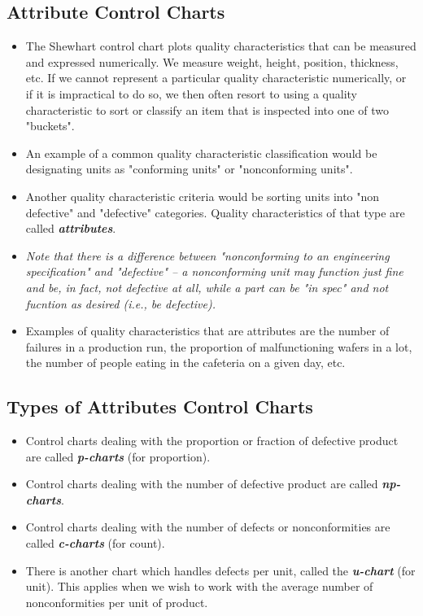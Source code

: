 \documentclass[]{article}
\begin{document}
\subsection{Attribute Control Charts}

\begin{itemize}
\item The Shewhart control chart plots quality characteristics that can be measured and expressed numerically. We measure weight, height, position, thickness, etc. If we cannot represent a particular quality characteristic numerically, or if it is impractical to do so, we then often resort to using a quality characteristic to sort or classify an item that is inspected into one of two "buckets".
\item  An example of a common quality characteristic classification would be designating units as "conforming units" or "nonconforming units". 
\item Another quality characteristic criteria would be sorting units into "non defective" and "defective" categories. Quality characteristics of that type are called \textit{\textbf{attributes}}.

\item \textit{Note that there is a difference between "nonconforming to an engineering specification" and "defective" -- a nonconforming unit may function just fine and be, in fact, not defective at all, while a part can be "in spec" and not fucntion as desired (i.e., be defective).}

\item Examples of quality characteristics that are attributes are the number of failures in a production run, the proportion of malfunctioning wafers in a lot, the number of people eating in the cafeteria on a given day, etc.
\end{itemize}
\subsection{Types of Attributes Control Charts}

\begin{itemize}
\item Control charts dealing with the proportion or fraction of defective product are called  \textbf{\textit{p-charts}} (for proportion).
\item Control charts dealing with the number of defective product are called  \textbf{\textit{np-charts}}.
\item Control charts dealing with the number of defects or nonconformities are called \textbf{\textit{c-charts}} (for count).
\item There is another chart which handles defects per unit, called the \textbf{\textit{u-chart}} (for unit). This applies when we wish to work with the average number of nonconformities per unit of product.
\end{itemize}
\end{document}
